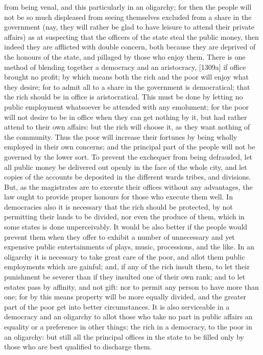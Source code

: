 \documentclass[12pt]{article}
\begin{document}
from being venal, and this particularly in an oligarchy; for then the people will not be so much displeased from seeing themselves excluded from a share in the government (nay, they will rather be glad to have leisure to attend their private affairs) as at suspecting that the officers of the state steal the public money, then indeed they are afflicted with double concern, both because they are deprived of the honours of the state, and pillaged by those who enjoy them. There is one method of blending together a democracy and an aristocracy, [1309a] if office brought no profit; by which means both the rich and the poor will enjoy what they desire; for to admit all to a share in the government is democratical; that the rich should be in office is aristocratical. This must be done by letting no public employment whatsoever be attended with any emolument; for the poor will not desire to be in office when they can get nothing by it, but had rather attend to their own affairs: but the rich will choose it, as they want nothing of the community. Thus the poor will increase their fortunes by being wholly employed in their own concerns; and the principal part of the people will not be governed by the lower sort. To prevent the exchequer from being defrauded, let all public money be delivered out openly in the face of the whole city, and let copies of the accounts be deposited in the different wards tribes, and divisions. But, as the magistrates are to execute their offices without any advantages, the law ought to provide proper honours for those who execute them well. In democracies also it is necessary that the rich should be protected, by not permitting their lands to be divided, nor even the produce of them, which in some states is done unperceivably. It would be also better if the people would prevent them when they offer to exhibit a number of unnecessary and yet expensive public entertainments of plays, music, processions, and the like. In an oligarchy it is necessary to take great care of the poor, and allot them public employments which are gainful; and, if any of the rich insult them, to let their punishment be severer than if they insulted one of their own rank; and to let estates pass by affinity, and not gift: nor to permit any person to have more than one; for by this means property will be more equally divided, and the greater part of the poor get into better circumstances. It is also serviceable in a democracy and an oligarchy to allot those who take no part in public affairs an equality or a preference in other things; the rich in a democracy, to the poor in an oligarchy: but still all the principal offices in the state to be filled only by those who are best qualified to discharge them.
\end{document}
